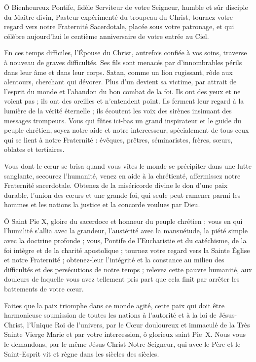\documentclass[%
a5paper%
,11pt%
,DIV=15%
,titlepage=on%
,headings=optiontoheadandtoc%
,headings=small%
,parskip=false%
,openany%
]{scrbook}
\begin{document}
\begin{multicols}{2}
Ô Bienheureux Pontife, fidèle Serviteur de votre Seigneur, humble et sûr disciple du Maître divin, Pasteur expérimenté du troupeau du Christ, tournez votre regard vers notre Fraternité Sacerdotale, placée sous votre patronage, et qui célèbre aujourd'hui le centième anniversaire de votre entrée au Ciel.

En ces temps difficiles, l’Épouse du Christ, autrefois confiée à vos soins, traverse à nouveau de graves difficultés. Ses fils sont menacés par d'innombrables périls dans leur âme et dans leur corps. Satan, comme un lion rugissant, rôde aux alentours, cherchant qui dévorer. Plus d'un devient sa victime, par attrait de l’esprit du monde et l’abandon du bon combat de la foi. Ils ont des yeux et ne voient pas ; ils ont des oreilles et n'entendent point. Ils ferment leur regard à la lumière de la vérité éternelle ; ils écoutent les voix des sirènes insinuant des messages trompeurs. Vous qui fûtes ici-bas un grand inspirateur et le guide du peuple chrétien, soyez notre aide et notre intercesseur, spécialement de tous ceux qui se lient à notre Fraternité : évêques, prêtres, séminaristes, frères, sœurs, oblates et tertiaires.

Vous dont le cœur se brisa quand vous vîtes le monde se précipiter dans une lutte sanglante, secourez l'humanité, venez en aide à la chrétienté, affermissez notre Fraternité sacerdotale. Obtenez de la miséricorde divine le don d'une paix durable, l’union des cœurs et une grande foi, qui seule peut ramener parmi les hommes et les nations la justice et la concorde voulues par Dieu.

Ô Saint Pie X, gloire du sacerdoce et honneur du peuple chrétien ; vous en qui l'humilité s’allia avec la grandeur, l'austérité avec la mansuétude, la piété simple avec la doctrine profonde ; vous, Pontife de l'Eucharistie et du catéchisme, de la foi intègre et de la charité apostolique ; tournez votre regard vers la Sainte Église et notre Fraternité ; obtenez-leur l'intégrité et la constance au milieu des difficultés et des persécutions de notre temps ; relevez cette pauvre humanité, aux douleurs de laquelle vous avez tellement pris part que cela finit par arrêter les battements de votre cœur.

Faites que la paix triomphe dans ce monde agité, cette paix qui doit être harmonieuse soumission de toutes les nations à l'autorité et à la loi de Jésus-Christ, l'Unique Roi de l'univers, par le Cœur douloureux et immaculé de la Très Sainte Vierge Marie et par votre intercession, ô glorieux saint Pie X. Nous vous le demandons, par le même Jésus-Christ Notre Seigneur, qui avec le Père et le Saint-Esprit vit et règne dans les siècles des siècles. 


\end{multicols}
\end{document}
